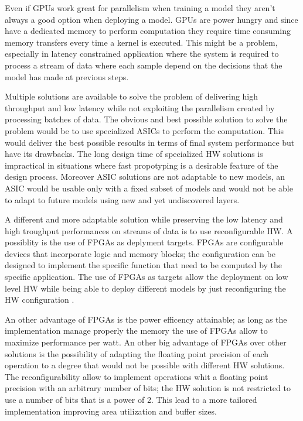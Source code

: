 \documentclass[../main.tex]{subfiles}
\begin{document}
Even if GPUs work great for parallelism when training a model they aren't always a good option when deploying a model.
GPUs are power hungry and since have a dedicated memory to perform computation they require time consuming memory transfers every time a kernel is executed.
This might be a problem, especially in latency constrained application where the system is required to process a stream of data where each sample depend on the decisions that the model has made at previous steps.

Multiple solutions are available to solve the problem of delivering high throughput and low latency while not exploiting the parallelism created by processing batches of data. The obvious and best possible solution to solve the problem would be to use specialized ASICs to perform the computation. This would deliver the best possible resoults in terms of final system performance but have its drawbacks. 
The long design time of specialized HW solutions is impractical in situations where fast propotyping is a desirable feature of the design process. 
Moreover ASIC solutions are not adaptable to new models, an ASIC would be usable only with a fixed subset of models and would not be able to adapt to future models using new and yet undiscovered layers.

A different and more adaptable solution while preserving the low latency and high troughput performances on streams of data is to use reconfigurable HW.
A possiblity is the use of FPGAs as deplyment targets.
FPGAs are configurable devices that incorporate logic and memory blocks; the configuration can be designed to implement the specific function that need to be computed by the specific application.
The use of FPGAs as targets allow the deployment on low level HW while being able to deploy different models by just reconfiguring the HW configuration \cite{DBLP:journals/corr/abs-1901-04988}.

An other advantage of FPGAs is the power efficency attainable; as long as the implementation manage properly the memory the use of FPGAs allow to maximize performance per watt.
An other big advantage of FPGAs over other solutions is the possibility of adapting the floating point precision of each operation to a degree that would not be possible with different HW solutions. 
The reconfigurability allow to implement operations whit a floating point precision with an arbitrary number of bits; the HW solution is not restricted to use a number of bits that is a power of 2. This lead to a more tailored implementation improving area utilization and buffer sizes.
\end{document}
